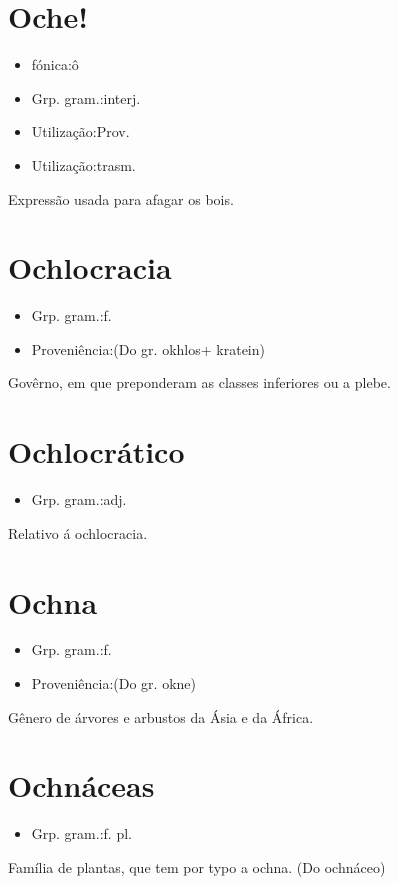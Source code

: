 \section{Oche!}
\begin{itemize}
\item {fónica:ô}
\end{itemize}
\begin{itemize}
\item {Grp. gram.:interj.}
\end{itemize}
\begin{itemize}
\item {Utilização:Prov.}
\end{itemize}
\begin{itemize}
\item {Utilização:trasm.}
\end{itemize}
Expressão usada para afagar os bois.
\section{Ochlocracia}
\begin{itemize}
\item {Grp. gram.:f.}
\end{itemize}
\begin{itemize}
\item {Proveniência:(Do gr. \textunderscore okhlos\textunderscore  + \textunderscore kratein\textunderscore )}
\end{itemize}
Govêrno, em que preponderam as classes inferiores ou a plebe.
\section{Ochlocrático}
\begin{itemize}
\item {Grp. gram.:adj.}
\end{itemize}
Relativo á ochlocracia.
\section{Ochna}
\begin{itemize}
\item {Grp. gram.:f.}
\end{itemize}
\begin{itemize}
\item {Proveniência:(Do gr. \textunderscore okne\textunderscore )}
\end{itemize}
Gênero de árvores e arbustos da Ásia e da África.
\section{Ochnáceas}
\begin{itemize}
\item {Grp. gram.:f. pl.}
\end{itemize}
Família de plantas, que tem por typo a ochna.
(Do \textunderscore ochnáceo\textunderscore )
